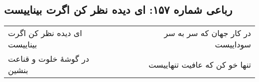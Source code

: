 \begin{center}
\section*{رباعی شماره ۱۵۷: ای دیده نظر کن اگرت بیناییست}
\label{sec:sh157}
\begin{longtable}{l p{0.5cm} r}
ای دیده نظر کن اگرت بیناییست
&&
در کار جهان که سر به سر سوداییست
\\
در گوشهٔ خلوت و قناعت بنشین
&&
تنها خو کن که عافیت تنهاییست
\\
\end{longtable}
\end{center}
